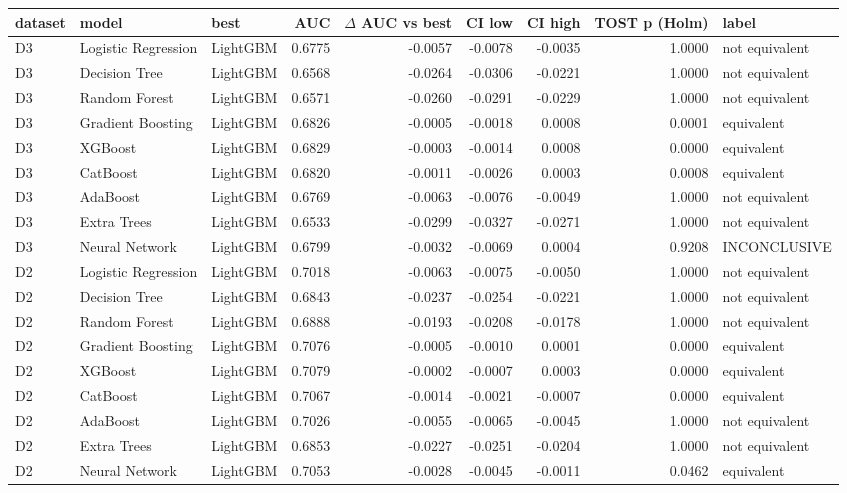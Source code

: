 \begin{tabular}{lllrrrrrl}
\toprule
dataset & model & best & AUC & $\Delta$ AUC vs best & CI low & CI high & TOST p (Holm) & label \\
\midrule
D3 & Logistic Regression & LightGBM & 0.6775 & -0.0057 & -0.0078 & -0.0035 & 1.0000 & not equivalent \\
D3 & Decision Tree & LightGBM & 0.6568 & -0.0264 & -0.0306 & -0.0221 & 1.0000 & not equivalent \\
D3 & Random Forest & LightGBM & 0.6571 & -0.0260 & -0.0291 & -0.0229 & 1.0000 & not equivalent \\
D3 & Gradient Boosting & LightGBM & 0.6826 & -0.0005 & -0.0018 & 0.0008 & 0.0001 & equivalent \\
D3 & XGBoost & LightGBM & 0.6829 & -0.0003 & -0.0014 & 0.0008 & 0.0000 & equivalent \\
D3 & CatBoost & LightGBM & 0.6820 & -0.0011 & -0.0026 & 0.0003 & 0.0008 & equivalent \\
D3 & AdaBoost & LightGBM & 0.6769 & -0.0063 & -0.0076 & -0.0049 & 1.0000 & not equivalent \\
D3 & Extra Trees & LightGBM & 0.6533 & -0.0299 & -0.0327 & -0.0271 & 1.0000 & not equivalent \\
D3 & Neural Network & LightGBM & 0.6799 & -0.0032 & -0.0069 & 0.0004 & 0.9208 & INCONCLUSIVE \\
D2 & Logistic Regression & LightGBM & 0.7018 & -0.0063 & -0.0075 & -0.0050 & 1.0000 & not equivalent \\
D2 & Decision Tree & LightGBM & 0.6843 & -0.0237 & -0.0254 & -0.0221 & 1.0000 & not equivalent \\
D2 & Random Forest & LightGBM & 0.6888 & -0.0193 & -0.0208 & -0.0178 & 1.0000 & not equivalent \\
D2 & Gradient Boosting & LightGBM & 0.7076 & -0.0005 & -0.0010 & 0.0001 & 0.0000 & equivalent \\
D2 & XGBoost & LightGBM & 0.7079 & -0.0002 & -0.0007 & 0.0003 & 0.0000 & equivalent \\
D2 & CatBoost & LightGBM & 0.7067 & -0.0014 & -0.0021 & -0.0007 & 0.0000 & equivalent \\
D2 & AdaBoost & LightGBM & 0.7026 & -0.0055 & -0.0065 & -0.0045 & 1.0000 & not equivalent \\
D2 & Extra Trees & LightGBM & 0.6853 & -0.0227 & -0.0251 & -0.0204 & 1.0000 & not equivalent \\
D2 & Neural Network & LightGBM & 0.7053 & -0.0028 & -0.0045 & -0.0011 & 0.0462 & equivalent \\

\end{tabular}
